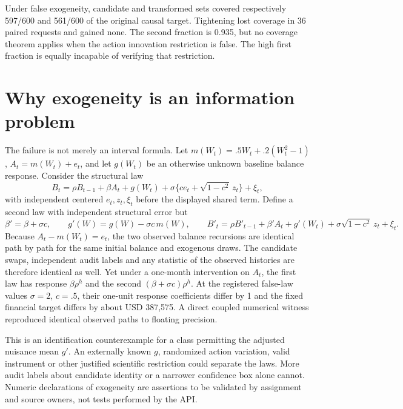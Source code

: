 \documentclass[11pt,a4paper]{article}
\begin{document}
Under false exogeneity, candidate and transformed sets covered respectively
597/600 and 561/600 of the original causal target. Tightening lost coverage
in 36 paired requests and gained none. The second fraction is 0.935, but no
coverage theorem applies when the action innovation restriction is false.
The high first fraction is equally incapable of verifying that restriction.

\section{Why exogeneity is an information problem}

The failure is not merely an interval formula. Let
$m(W_t)=.5W_t+.2(W_t^2-1)$, $A_t=m(W_t)+e_t$, and let $g(W_t)$ be an
otherwise unknown baseline balance response. Consider the structural law
\begin{equation}\label{eq:confounded}
 B_t=\rho B_{t-1}+\beta A_t+g(W_t)
      +\sigma\{c e_t+\sqrt{1-c^2}\,z_t\}+\xi_t,
\end{equation}
with independent centered $e_t,z_t,\xi_t$ before the displayed shared term.
Define a second law with independent structural error but
\begin{equation}
 \beta'=\beta+\sigma c,\qquad
 g'(W)=g(W)-\sigma c\,m(W),\qquad
 B'_t=\rho B'_{t-1}+\beta'A_t+g'(W_t)
       +\sigma\sqrt{1-c^2}\,z_t+\xi_t.
\end{equation}
Because $A_t-m(W_t)=e_t$, the two observed balance recursions are
identical path by path for the same initial balance and exogenous draws.
The candidate swaps, independent audit labels and any statistic of the
observed histories are therefore identical as well. Yet under a one-month
intervention on $A_t$, the first law has response $\beta\rho^h$ and the
second $(\beta+\sigma c)\rho^h$. At the registered false-law values
$\sigma=2$, $c=.5$, their one-unit response coefficients differ by 1 and
the fixed financial target differs by about USD 387,575. A direct coupled
numerical witness reproduced identical observed paths to floating precision.

This is an identification counterexample for a class permitting the adjusted
nuisance mean $g'$. An externally known $g$, randomized action variation,
valid instrument or other justified scientific restriction could separate
the laws. More audit labels about candidate identity or a narrower confidence
box alone cannot. Numeric declarations of exogeneity are assertions to be
validated by assignment and source owners, not tests performed by the API.
\end{document}
